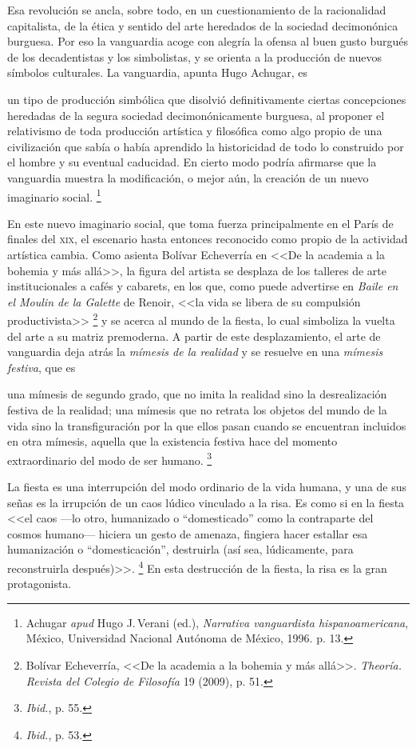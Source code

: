 \documentclass[14pt,twoside,final]{extbook} %
\let\oldfootnote\footnote
\renewcommand\footnote[1]{%
\oldfootnote{\hspace{1mm}#1}}
\begin{document}
Esa revolución se ancla, sobre todo, en un cuestionamiento de la racionalidad capitalista, de la ética y sentido del arte heredados de la sociedad decimonónica burguesa. Por eso la vanguardia acoge con alegría la ofensa al buen gusto burgués de los decadentistas y los simbolistas, y se orienta a la producción de nuevos símbolos culturales. La vanguardia, apunta Hugo Achugar, es
\begin{quoting}
un tipo de producción simbólica que disolvió definitivamente ciertas concepciones heredadas de la segura sociedad decimonónicamente burguesa, al proponer el relativismo de toda producción artística y filosófica como algo propio de una civilización que sabía o había aprendido la historicidad de todo lo construido por el hombre y su eventual caducidad. En cierto modo podría afirmarse que la vanguardia muestra la modificación, o mejor aún, la creación de un nuevo imaginario social.\footnote{Achugar \emph{apud} Hugo J.\,Verani (ed.), \emph{Narrativa vanguardista hispanoamericana}, México, Universidad Nacional Autónoma de México, 1996. p. 13.}
\end{quoting}
En este nuevo imaginario social, que toma fuerza principalmente en el París de finales del \textsc{xix}, el escenario hasta entonces reconocido como propio de la actividad artística cambia. Como asienta Bolívar Echeverría en <<De la academia a la bohemia y más allá>>, la figura del artista se desplaza de los talleres de arte institucionales a cafés y cabarets, en los que, como puede advertirse en \emph{Baile en el Moulin de la Galette} de Renoir, <<la vida se libera de su compulsión productivista>>\footnote{Bolívar Echeverría, <<De la academia a la bohemia y más allá>>. \emph{Theoría. Revista del Colegio de Filosofía} 19 (2009), p. 51.} y se acerca al mundo de la fiesta, lo cual simboliza la vuelta del arte a su matriz premoderna. A partir de este desplazamiento, el arte de vanguardia deja atrás la \emph{mímesis de la realidad} y se resuelve en una \emph{mímesis festiva}, que es
\begin{quoting}
una mímesis de segundo grado, que no imita la realidad sino la desrealización festiva de la realidad; una mímesis que no retrata los objetos del mundo de la vida sino la transfiguración por la que ellos pasan cuando se encuentran incluidos en otra mímesis, aquella que la existencia festiva hace del momento extraordinario del modo de ser humano.\footnote{\emph{Ibid.}, p. 55.}
\end{quoting}
La fiesta es una interrupción del modo ordinario de la vida humana, y una de sus señas es la irrupción de un caos lúdico vinculado a la risa. Es como si en la fiesta <<el caos ---lo otro, humanizado o ``domesticado'' como la contraparte del cosmos humano--- hiciera un gesto de amenaza, fingiera hacer estallar esa humanización o ``domesticación'', destruirla (así sea, lúdicamente, para reconstruirla después)>>.\footnote{\emph{Ibid.}, p. 53.} En esta destrucción de la fiesta, la risa es la gran protagonista.
\end{document}
